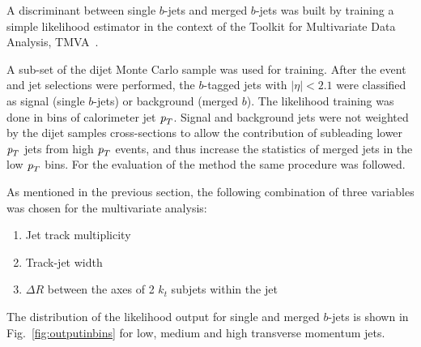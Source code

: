 A discriminant between single $b$-jets and merged $b$-jets was built by training a simple likelihood estimator in the context of the Toolkit for Multivariate Data Analysis, TMVA~\cite{Hocker:2007ht}.

A sub-set of the dijet Monte Carlo sample was used for training. After the event and jet selections were performed, the $b$-tagged jets with $|\eta| < 2.1$ were classified as signal (single $b$-jets) or background (merged $b$). %
The likelihood training was done in bins of calorimeter jet ${\emph{p}_{T}}$. %
Signal and background jets were not weighted by the dijet samples cross-sections to allow the contribution of subleading lower ${\emph{p}_{T}}$ jets from high ${\emph{p}_{T}}$ events, and thus increase the statistics of merged jets in the low ${\emph{p}_{T}}$ bins. For the evaluation of the method the same procedure was followed.


As mentioned in the previous section, the following combination of three variables was chosen for the multivariate analysis:
\begin{enumerate}\addtolength{\itemsep}{-0.4\baselineskip}
\item
Jet track multiplicity
\item
Track-jet width
\item
$\Delta R$ between the axes of 2 $k_t$ subjets within the jet
\end{enumerate}
%

The distribution of the likelihood output for single and merged $b$-jets is shown in  Fig.~\ref{fig:outputinbins} for low, medium and high transverse momentum jets.

